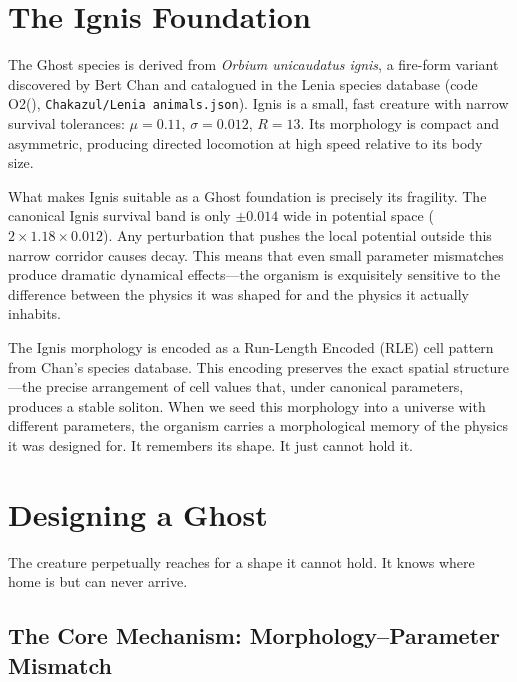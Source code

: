 \documentclass[11pt,a4paper]{article}
\newcommand{\spc}[1]{\textit{#1}}
\begin{document}
\section{The Ignis Foundation}

The Ghost species is derived from \spc{Orbium unicaudatus ignis}, a
fire-form variant discovered by Bert Chan and catalogued in the Lenia
species database (code O2(\textendash), \texttt{Chakazul/Lenia
animals.json}). Ignis is a small, fast creature with narrow survival
tolerances: $\mu = 0.11$, $\sigma = 0.012$, $R = 13$. Its morphology is
compact and asymmetric, producing directed locomotion at high speed relative
to its body size.

What makes Ignis suitable as a Ghost foundation is precisely its fragility.
The canonical Ignis survival band is only $\pm 0.014$ wide in potential
space ($2\times 1.18\times 0.012$). Any perturbation that pushes the local
potential outside this narrow corridor causes decay. This means that even
small parameter mismatches produce dramatic dynamical effects---the organism
is exquisitely sensitive to the difference between the physics it was
shaped for and the physics it actually inhabits.

The Ignis morphology is encoded as a Run-Length Encoded (RLE) cell pattern
from Chan's species database. This encoding preserves the exact spatial
structure---the precise arrangement of cell values that, under canonical
parameters, produces a stable soliton. When we seed this morphology into a
universe with different parameters, the organism carries a morphological
memory of the physics it was designed for. It remembers its shape. It just
cannot hold it.

\section{Designing a Ghost}

\begin{pullquote}
The creature perpetually reaches for a shape it cannot hold. It knows where
home is but can never arrive.
\end{pullquote}

\subsection{The Core Mechanism: Morphology--Parameter Mismatch}
\end{document}
